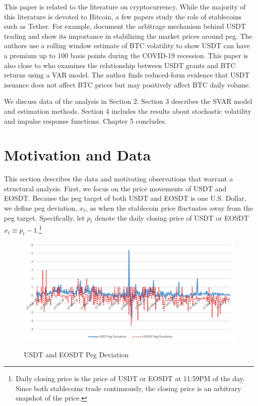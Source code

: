 \documentclass[12pt]{article}
\begin{document}
This paper is related to the literature on cryptocurrency. While the majority of this literature is devoted to Bitcoin, a few papers study the role of stablecoins such as Tether. For example, \cite{lyons} document the arbitrage mechanism behind USDT trading and show its importance in stabilizing the market prices around peg. The authors use a rolling window estimate of BTC volatility to show USDT can have a premium up to 100 basis points during the COVID-19 recession. This paper is also close to \cite{wei} who examines the relationship between USDT grants and BTC returns using a VAR model. The author finds reduced-form evidence that USDT issuance does not affect BTC prices but may positively affect BTC daily volume. 

We discuss data of the analysis in Section 2. Section 3 describes the SVAR model and estimation methods. Section 4 includes the results about stochastic volatility and impulse response functions. Chapter 5 concludes. 





\section{Motivation and Data}
This section describes the data and motivating observations that warrant a structural analysis. First, we focus on the price movements of USDT and EOSDT. Because the peg target of both USDT and EOSDT is one U.S. Dollar, we define peg deviation, $x_t$, as when the stablecoin price fluctuates away from the peg target. Specifically, let $p_t$ denote the daily closing price of USDT or EOSDT $x_t \equiv p_t - 1$.\footnote{Daily closing price is the price of USDT or EOSDT at 11:59PM of the day. Since both stablecoins trade continuously, the closing price is an arbitrary snapshot of the price.} 

\begin{figure}
  \centering
  \caption{USDT and EOSDT Peg Deviation}
  \includegraphics[width=1\textwidth]{pegdeviationplot}
  \label{pegdevplot}
\end{figure}
\end{document}
